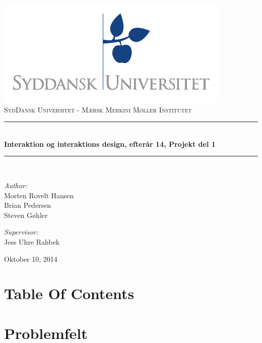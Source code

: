 \documentclass[a4paper,titlepage,fleqn,12pt]{article}
\begin{document}
\begin{titlepage}
	\begin{center}
	\includegraphics[scale=1.5,page=7]{sdu_logos.pdf}~\\[0.5cm]
	\textsc{\Large{SydDansk Universitet - Mærsk Merkini Møller Institutet}} \\[0.2cm]
	\rule{12cm}{1pt} \\[0.4cm]
	{ \huge \bfseries Interaktion og interaktions design, efterår 14, Projekt del 1 \\[0.4cm] }
	\rule{12cm}{1pt} \\[1.5cm]
	
	\begin{minipage}{0.4\textwidth}
		\begin{flushleft} \large
			\textit{Author:}\\
			Morten Rovelt Hansen\\
			Brian Pedersen\\
			Steven Gøhler\\
		\end{flushleft}
	\end{minipage}
	\begin{minipage}{0.4\textwidth}
		\begin{flushright} \large
			\textit{Supervisor:} \\
			Jess Uhre Rahbek
		\end{flushright}
	\end{minipage}
	
	\vfill
	
	{\large Oktober 10, 2014}
	\end{center}
	\newpage
\end{titlepage}

\section{Table Of Contents}
\tableofcontents
\newpage

\section{Problemfelt}
\end{document}
